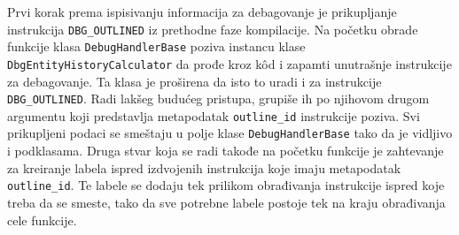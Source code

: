\documentclass[12pt,oneside]{memoir}
\begin{document}
Prvi korak prema ispisivanju informacija za debagovanje je prikupljanje instrukcija \verb|DBG_OUTLINED| iz prethodne faze kompilacije.
Na početku obrade funkcije klasa \verb|DebugHandlerBase| poziva instancu klase \verb|DbgEntityHistoryCalculator| da prođe kroz k\^od i zapamti unutrašnje instrukcije za debagovanje.
Ta klasa je proširena da isto to uradi i za instrukcije \verb|DBG_OUTLINED|.
Radi lakšeg budućeg pristupa, grupiše ih po njihovom drugom argumentu koji predstavlja metapodatak \verb|outline_id| instrukcije poziva. %
Svi prikupljeni podaci se smeštaju u polje klase \verb|DebugHandlerBase| tako da je vidljivo i podklasama.
Druga stvar koja se radi takođe na početku funkcije je zahtevanje za kreiranje labela ispred izdvojenih instrukcija koje imaju metapodatak \verb|outline_id|.
Te labele se dodaju tek prilikom obrađivanja instrukcije ispred koje treba da se smeste, tako da sve potrebne labele postoje tek na kraju obrađivanja cele funkcije.
\end{document}
